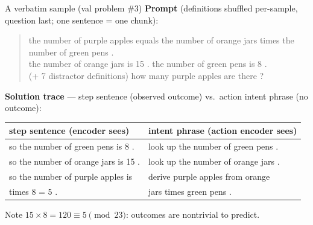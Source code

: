 \documentclass[aspectratio=169,10pt]{beamer}
\begin{document}
\begin{frame}[fragile]{A verbatim sample (val problem \#3)}
\footnotesize
\textbf{Prompt} (definitions shuffled per-sample, question last; one sentence = one chunk):
\begin{quote}\ttfamily
the number of purple apples equals the number of orange jars times the number of green pens .\\
the number of orange jars is 15 . \quad the number of green pens is 8 .\\
\textcolor{cgray}{(+ 7 distractor definitions)} \quad how many purple apples are there ?
\end{quote}
\textbf{Solution trace} --- step sentence (observed outcome) vs.\ action intent phrase (no outcome):
\begin{center}\ttfamily\begin{tabular}{l|l}
step sentence (encoder sees) & intent phrase (action encoder sees)\\\hline
so the number of green pens is 8 . & look up the number of green pens .\\
so the number of orange jars is 15 . & look up the number of orange jars .\\
so the number of purple apples is & derive purple apples from orange\\
\quad 15 times 8 = 5 . & \quad jars times green pens .
\end{tabular}\end{center}
\smallskip
Note $15\times 8 = 120 \equiv 5 \pmod{23}$: outcomes are nontrivial to predict.
\end{frame}
\end{document}
